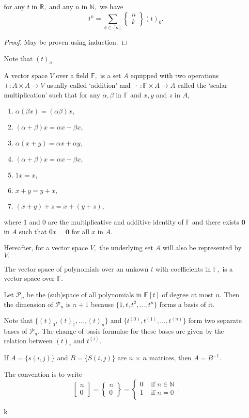 \begin{theorem}
for any $t$ in $\mathbb{R},$ and any $n$ in $\mathbb{N},$ we have
$$	 t^n = \sum_{k \in [n]} 
\begin{Bmatrix} n\\k \end{Bmatrix} (t)_k. $$
\end{theorem}

\begin{proof}
	May be proven using induction.
\end{proof}

\begin{remark}
	Note that $(t)_n$ 
\end{remark}


\begin{definition}
	A vector space $V$ over a field $\mathbb{F},$ is a set
	$A$ equipped with two operations $+ \colon A \times A \to V$ usually called `addition' and
	$\ \cdot \  \colon \mathbb{F} \times A \to A$ called the `scalar multiplication' such that for any $\alpha, \beta$ in
	$\mathbb{F}$ and $x,y$ and $z$ in $A,$
	\begin{enumerate}
		\item $\alpha(\beta x) = (\alpha \beta)x,$
		\item $(\alpha + \beta) x = \alpha x + \beta x,$
		\item $\alpha(x + y) = \alpha x + \alpha y,$
		\item $(\alpha + \beta) x = \alpha x + \beta x,$
		\item $ 1 x = x,$
		\item $x+y = y+x,$
		\item $(x+y)+z = x + (y+z),$
	\end{enumerate}
	where $1$ and $0$ are the multiplicative and additive identity of $\mathbb{F}$ and there exists $\mathbf{0}$ in $A$ such that $0 x = \mathbf{0}$
	for all $x$ in $A.$
\end{definition}

Hereafter, for a vector space $V,$ the underlying set $A$ will also be 
represented by $V.$

The vector space of polynomials over an unkown $t$ with coefficients
in $\mathbb{F},$ is a vector space over $\mathbb{F}.$

Let $\mathcal{P}_n$ be the (sub)space of all polynomials in
$\mathbb{F}[t]$ of degree at most $n.$ Then  
the dimension of $\mathcal{P}_n$ is $n+1$ because $\{ 1, t, t^2,
\dotsc, t^n \}$ forms a basis of it.

Note that $\{ (t)_0, (t)_1, \dotsc, (t)_n \}$ and 
$\{ t^{(0)}, t^{(1)}, \dotsc, t^{(n)} \}$ form two separate bases of 
$\mathcal{P}_n.$ The change of basis formulae for these bases are given
by the relation between $(t)_i$ and  $t^{(i)}.$

If $A = \{ s(i,j) \}$ and $ B = \{S(i,j) \} $ are $n \, \times  \, n$
matrices, then $A = B^{-1}.$

The convention is to write 
$$\begin{bmatrix}n\\0\end{bmatrix} =
\begin{Bmatrix}n\\0\end{Bmatrix} = 
\begin{cases}
0 & \text{ if } n \in \mathbb{N} \\
1 & \text{ if } n = 0 \\
\end{cases}. $$

k

